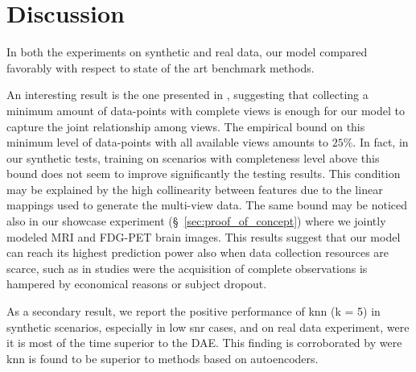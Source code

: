 \section{Discussion}

In both the experiments on synthetic and real data, our model compared favorably with respect to state of the art benchmark methods.

An interesting result is the one presented in , suggesting that collecting a minimum amount of data-points with complete views is enough for our model to capture the joint relationship among views.
The empirical bound on this minimum level of data-points with all available views amounts to $25\%$.
In fact, in our synthetic tests, training on scenarios with completeness level above this bound does not seem to improve significantly the testing results.
This condition may be explained by the high collinearity between features due to the linear mappings used to generate the multi-view data.
The same bound may be noticed also in our showcase experiment (\S~\ref{sec:proof_of_concept}) where we jointly modeled MRI and FDG-PET brain images.
This results suggest that our model can reach its highest prediction power also when data collection resources are scarce,
such as in studies were the acquisition of complete observations is hampered by economical reasons or subject dropout.

As a secondary result, we report the positive performance of knn (k = 5) in synthetic scenarios, especially in low snr cases, and on real data experiment, were it is most of the time superior to the DAE.
This finding is corroborated by \cite{Platias2020} were knn is found to be superior to methods based on autoencoders.

